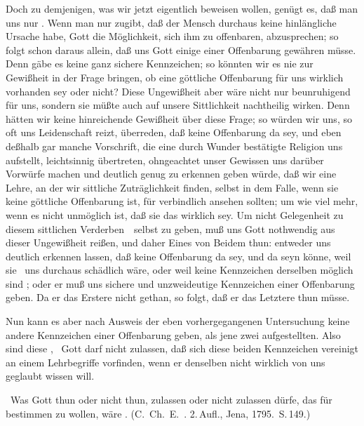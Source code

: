 \begin{aufza}
\item Doch zu demjenigen, was wir jetzt eigentlich beweisen wollen, genügt es, daß man uns nur . Wenn man nur zugibt, daß der Mensch durchaus keine hinlängliche Ursache habe, Gott die Möglichkeit, sich ihm zu offenbaren, abzusprechen; so folgt schon daraus allein, daß uns Gott einige  einer Offenbarung gewähren müsse. Denn gäbe es keine ganz sichere Kennzeichen; so könnten wir es nie zur Gewißheit in der Frage bringen, ob eine göttliche Offenbarung für uns wirklich vorhanden sey oder nicht? Diese Ungewißheit aber wäre nicht nur beunruhigend für uns, sondern sie müßte auch auf unsere Sittlichkeit nachtheilig wirken. Denn hätten wir keine hinreichende Gewißheit über diese Frage; so würden wir uns, so oft uns Leidenschaft reizt, überreden, daß keine Offenbarung da sey, und eben deßhalb gar manche Vorschrift, die eine durch Wunder bestätigte Religion uns aufstellt, leichtsinnig übertreten, ohngeachtet unser Gewissen uns darüber Vorwürfe machen und deutlich genug zu erkennen geben würde, daß wir eine Lehre, an der wir sittliche Zuträglichkeit finden, selbst in dem Falle, wenn sie keine göttliche Offenbarung ist, für verbindlich ansehen sollten; um wie viel mehr, wenn es nicht unmöglich ist, daß sie das wirklich sey. Um nicht Gelegenheit zu diesem sittlichen Verderben~\ selbst zu geben, muß uns Gott nothwendig aus dieser Ungewißheit reißen, und daher Eines von Beidem thun: entweder uns deutlich erkennen lassen, daß keine Offenbarung da sey, und da seyn könne, weil sie \zB\ uns durchaus schädlich wäre, oder weil keine Kennzeichen derselben möglich sind \udgl ; oder er muß uns sichere und unzweideutige Kennzeichen einer Offenbarung geben. Da er das Erstere nicht gethan, so folgt, daß er das Letztere thun müsse.
\item Nun kann es aber nach Ausweis der eben vorhergegangenen Untersuchung keine andere Kennzeichen einer Offenbarung geben, als jene zwei aufgestellten. Also sind diese , \dh\ Gott darf nicht zulassen, daß sich diese beiden Kennzeichen vereinigt an einem Lehrbegriffe vorfinden, wenn er denselben nicht wirklich von uns geglaubt wissen will.\par
\item[\RWbet{Einwurf.}]\ Was Gott thun oder nicht thun, zulassen oder nicht zulassen dürfe, das für  bestimmen zu wollen, wäre . (C.~Ch.~E.~. 2.\,Aufl., Jena, 1795.\ S.\,149.)\par

\end{aufza}
